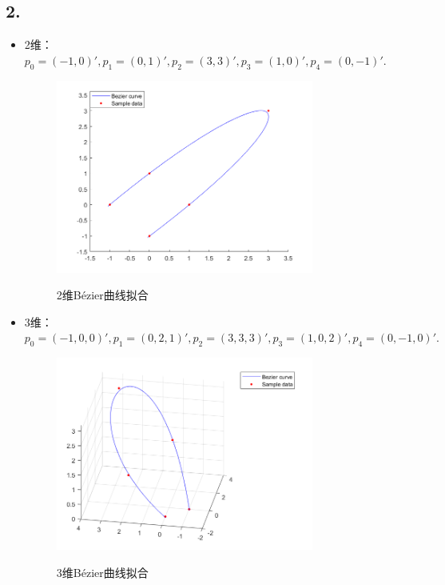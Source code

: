 \documentclass[utf8]{ctexart}
\begin{document}
\subsection*{2.}
\begin{itemize}
    \item 2维：$p_0 = (-1,0)',
    p_1 = (0,1)',
    p_2 = (3,3)',
    p_3 = (1,0)',
    p_4 = (0,-1)'.$

    \begin{figure}[H]
        \centering
        \includegraphics[width=0.8\textwidth]{bezierFit_2d.png}
        \label{fig3}
        \caption{2维Bézier曲线拟合}
    \end{figure}

    \item 3维：$p_0 = (-1,0,0)',
    p_1 = (0,2,1)',
    p_2 = (3,3,3)',
    p_3 = (1,0,2)',
    p_4 = (0,-1,0)'.$
    \begin{figure}[H]
        \centering
        \includegraphics[width=0.8\textwidth]{bezierFit_3d.png}
        \label{fig4}
        \caption{3维Bézier曲线拟合}
    \end{figure}
\end{itemize}
\end{document}
